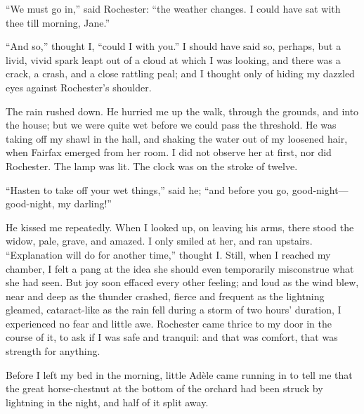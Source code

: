 \enquote{We must go in,} said \Mr{} Rochester: \enquote{the weather
	changes. I could have sat with thee till morning, Jane.}

\enquote{And so,} thought I, \enquote{could I with you.} I should have
said so, perhaps, but a livid, vivid spark leapt out of a cloud at which
I was looking, and there was a crack, a crash, and a close rattling
peal; and I thought only of hiding my dazzled eyes against \Mr{}
Rochester's shoulder.

The rain rushed down. He hurried me up the walk, through the grounds,
and into the house; but we were quite wet before we could pass the
threshold. He was taking off my shawl in the hall, and shaking the
water out of my loosened hair, when \Mrs{} Fairfax emerged from her room.
I did not observe her at first, nor did \Mr{} Rochester. The lamp was
lit. The clock was on the stroke of twelve.

\enquote{Hasten to take off your wet things,} said he; \enquote{and
	before you go, good-night---good-night, my darling!}

He kissed me repeatedly. When I looked up, on leaving his arms, there
stood the widow, pale, grave, and amazed. I only smiled at her, and ran
upstairs. \enquote{Explanation will do for another time,} thought I\@.
Still, when I reached my chamber, I felt a pang at the idea she should
even temporarily misconstrue what she had seen. But joy soon effaced
every other feeling; and loud as the wind blew, near and deep as the
thunder crashed, fierce and frequent as the lightning gleamed,
cataract-like as the rain fell during a storm of two hours' duration, I
experienced no fear and little awe. \Mr{} Rochester came thrice to my
door in the course of it, to ask if I was safe and tranquil: and that
was comfort, that was strength for anything.

Before I left my bed in the morning, little Adèle came running in to
tell me that the great horse-chestnut at the bottom of the orchard had
been struck by lightning in the night, and half of it split away.
